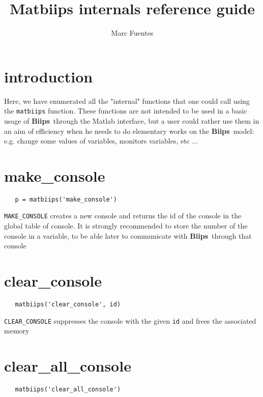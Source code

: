 \documentclass[11pt,twoside]{article}
\newcommand{\biips}{{\bf Biips}{}}
\begin{document}
\title{Matbiips internals reference guide}
\author{Marc Fuentes}
\date{}

\maketitle

\tableofcontents

\section{introduction}

  Here, we have enumerated all the "internal" functions that one could call using the \texttt{matbiips} function. These functions are not intended
  to be used in a basic usage of \biips\ through the Matlab interface, but a user could rather use them in an aim of efficiency when he needs to
  do elementary works on the \biips\ model: e.g. change some values of variables, monitors variables, etc ...

\section{make\_console}
 \begin{lstlisting}
   p = matbiips('make_console')
 \end{lstlisting}

   \texttt{MAKE\_CONSOLE}  creates a new console and returns the id of the console in the global table of console. It
   is strongly recommended to store the number of the console in a variable, to be able later to communicate with \biips\  through that
   console

\section{clear\_console}

 \begin{lstlisting}
   matbiips('clear_console', id)
 \end{lstlisting}

  \texttt{CLEAR\_CONSOLE} suppresses the console with the given \texttt{id} and frees the associated memory

\section{clear\_all\_console}

 \begin{lstlisting}
   matbiips('clear_all_console')
 \end{lstlisting}
\end{document}
